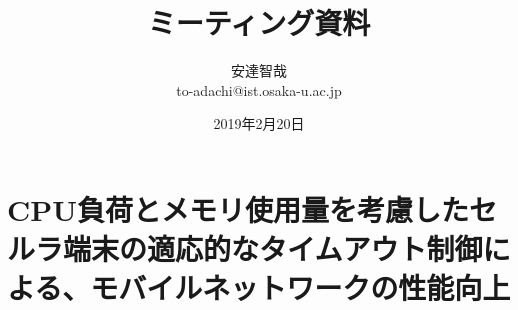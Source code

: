 \documentclass[a4j]{ujarticle}
\title{ミーティング資料}
\author{安達智哉\\to-adachi@ist.osaka-u.ac.jp}
\date{2019年2月20日}
\begin{document}
\maketitle

\section{CPU負荷とメモリ使用量を考慮したセルラ端末の適応的なタイムアウト制御による、モバイルネットワークの性能向上}



%
%
\end{document}
